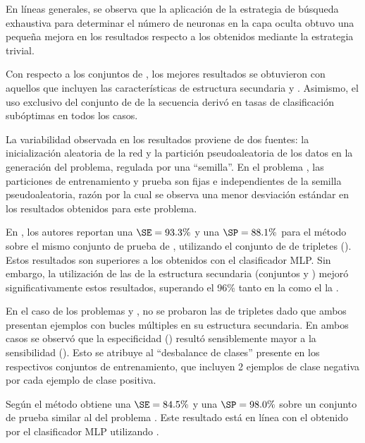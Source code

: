 
En líneas generales, se observa que la aplicación de la estrategia de
búsqueda exhaustiva para determinar el número de neuronas en la capa
oculta obtuvo una pequeña mejora en los resultados respecto a los
obtenidos mediante la estrategia trivial.

Con respecto a los conjuntos de , los mejores resultados se
obtuvieron con aquellos que incluyen las características de estructura
secundaria  y .
Asimismo, el uso exclusivo del conjunto de  de la secuencia
derivó en tasas de clasificación subóptimas en todos los casos.

La variabilidad observada en los resultados proviene de dos fuentes:
la inicialización aleatoria de la red y la partición pseudoaleatoria de
los datos en la generación del problema, regulada por una ``semilla''.
En el problema \prob\tripletsvm{}, las particiones de entrenamiento y
prueba son fijas e independientes de la semilla pseudoaleatoria,
razón por la cual se observa una menor desviación estándar en los
resultados obtenidos para este problema.

En \cite{xue}, los autores reportan una $\SE=93.3\%$ y una
$\SP=88.1\%$ para el método \work\tripletsvm{} sobre el mismo conjunto
de prueba de \prob\tripletsvm{}, utilizando el conjunto de 
de tripletes ().
Estos resultados son superiores a los obtenidos con el clasificador
MLP.
Sin embargo, la utilización de las  de la estructura
secundaria (conjuntos  y ) mejoró significativamente
estos resultados, superando el 96\% tanto en la \SE{} como el la \SP.

En el caso de los problemas \prob\mipred{} y \prob\micropred{}, no se
probaron las  de tripletes dado que ambos presentan ejemplos
con bucles múltiples en su estructura secundaria.
En ambos casos se observó que la especificidad (\SP) resultó
sensiblemente mayor a la sensibilidad (\SE).
Esto se atribuye al ``desbalance de clases'' presente en los
respectivos conjuntos de entrenamiento, que incluyen 2 ejemplos de
clase negativa por cada ejemplo de clase positiva.

Según \cite{ng} el método \work{\mipred} obtiene una $\SE=84.5\%$ y
una $\SP=98.0\%$ sobre un conjunto de prueba similar al del problema
\prob\mipred{}.
Este resultado está en línea con el obtenido por el clasificador MLP
utilizando  .

